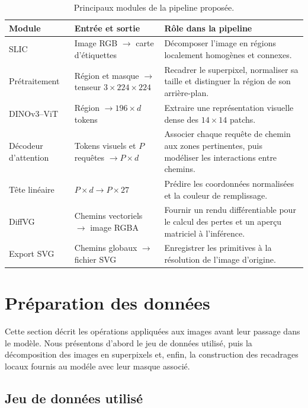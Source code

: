 \documentclass[12pt, a4paper, oneside]{report}
\begin{document}
\begin{table}[H]
    \centering
    \small
    \caption{Principaux modules de la pipeline proposée.}
    \label{tab:modules_approche}
    \begin{tabular}{p{2.7cm}p{4.1cm}p{5.5cm}}
        \toprule
        \textbf{Module} & \textbf{Entrée et sortie} & \textbf{Rôle dans la pipeline} \\
        \midrule
        SLIC & Image RGB $\rightarrow$ carte d'étiquettes & Décomposer l'image en régions localement homogènes et connexes. \\
        Prétraitement & Région et masque $\rightarrow$ tenseur $3 \times 224 \times 224$ & Recadrer le superpixel, normaliser sa taille et distinguer la région de son arrière-plan. \\
        DINOv3--ViT & Région $\rightarrow 196 \times d$ tokens & Extraire une représentation visuelle dense des $14 \times 14$ patchs. \\
        Décodeur d'attention & Tokens visuels et $P$ requêtes $\rightarrow P \times d$ & Associer chaque requête de chemin aux zones pertinentes, puis modéliser les interactions entre chemins. \\
        Tête linéaire & $P \times d \rightarrow P \times 27$ & Prédire les coordonnées normalisées et la couleur de remplissage. \\
        DiffVG & Chemins vectoriels $\rightarrow$ image RGBA & Fournir un rendu différentiable pour le calcul des pertes et un aperçu matriciel à l'inférence. \\
        Export SVG & Chemins globaux $\rightarrow$ fichier SVG & Enregistrer les primitives à la résolution de l'image d'origine. \\
        \bottomrule
    \end{tabular}
\end{table}

\section{Préparation des données}
\label{sec:preparation_donnees_approche}

Cette section décrit les opérations appliquées aux images avant leur passage dans le modèle. Nous présentons d'abord le jeu de données utilisé, puis la décomposition des images en superpixels et, enfin, la construction des recadrages locaux fournis au modéle avec leur masque associé.

\subsection{Jeu de données utilisé}
\end{document}
